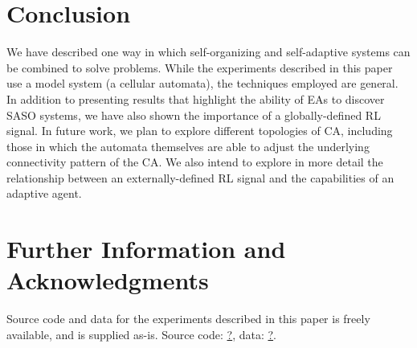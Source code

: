 \documentclass[10pt, conference, compsocconf]{IEEEtran}
\begin{document}
\section{Conclusion}\label{s:conclusion}
We have described one way in which self-organizing and self-adaptive systems can be combined to solve problems.  While the experiments described in this paper use a model system (a cellular automata), the techniques employed are general.  In addition to presenting results that highlight the ability of EAs to discover SASO systems, we have also shown the importance of a globally-defined RL signal.  In future work, we plan to explore different topologies of CA, including those in which the automata themselves are able to adjust the underlying connectivity pattern of the CA.  We also intend to explore in more detail the relationship between an externally-defined RL signal and the capabilities of an adaptive agent.

\section*{Further Information and Acknowledgments}
Source code and data for the experiments described in this paper is freely available, and is supplied as-is.  Source code: \url{?}, data: \url{?}.


%

\end{document}
